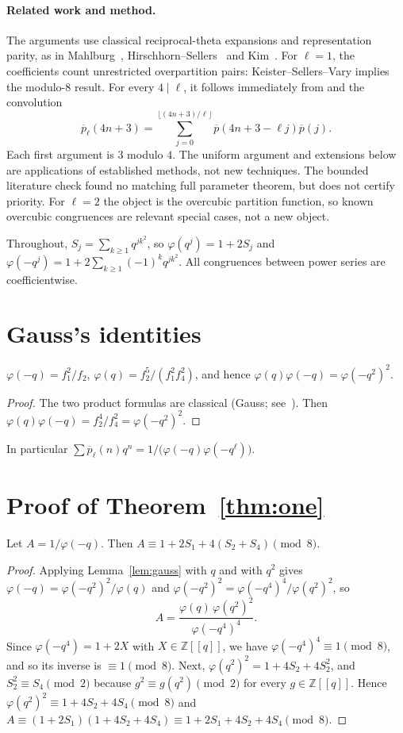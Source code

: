 \documentclass[11pt]{article}
\theoremstyle{remark}\newtheorem{remark}[theorem]{Remark}
\newcommand{\pb}{\overline{p}}
\begin{document}
\paragraph{Related work and method.} The arguments use classical reciprocal-theta expansions and representation parity, as in Mahlburg~\cite{Mahlburg}, Hirschhorn--Sellers~\cite{HS} and Kim~\cite{Kim08}. For $\ell=1$, the coefficients count unrestricted overpartition pairs: Keister--Sellers--Vary \cite[Theorem~9, $k=2$]{KSV} implies the modulo-$8$ result. For every $4\mid\ell$, it follows immediately from \cite[Theorem~2, equation~(6)]{HS} and the convolution
\[\pb_\ell(4n+3)=\sum_{j=0}^{\lfloor(4n+3)/\ell\rfloor}\pb(4n+3-\ell j)\pb(j).\]
Each first argument is $3$ modulo $4$. The uniform argument and extensions below are applications of established methods, not new techniques. The bounded literature check found no matching full parameter theorem, but does not certify priority. For $\ell=2$ the object is the overcubic partition function, so known overcubic congruences are relevant special cases, not a new object.

Throughout, $S_j=\sum_{k\ge1}q^{jk^2}$, so $\varphi(q^j)=1+2S_j$ and $\varphi(-q^j)=1+2\sum_{k\ge1}(-1)^kq^{jk^2}$. All congruences between power series are coefficientwise.

\section{Gauss's identities}
\begin{lemma}\label{lem:gauss}
$\varphi(-q)=f_1^2/f_2$, $\varphi(q)=f_2^5/(f_1^2f_4^2)$, and hence $\varphi(q)\varphi(-q)=\varphi(-q^2)^2$.
\end{lemma}
\begin{proof}
The two product formulas are classical (Gauss; see~\cite[Entry~22]{Berndt}). Then $\varphi(q)\varphi(-q)=f_2^4/f_4^2=\varphi(-q^2)^2$.
\end{proof}
In particular $\sum\pb_\ell(n)q^n=1/\bigl(\varphi(-q)\varphi(-q^\ell)\bigr)$.

\section{Proof of Theorem~\ref{thm:one}}
\begin{lemma}\label{lem:A}
Let $A=1/\varphi(-q)$. Then $A\equiv1+2S_1+4(S_2+S_4)\pmod 8$.
\end{lemma}
\begin{proof}
Applying Lemma~\ref{lem:gauss} with $q$ and with $q^2$ gives $\varphi(-q)=\varphi(-q^2)^2/\varphi(q)$ and $\varphi(-q^2)^2=\varphi(-q^4)^4/\varphi(q^2)^2$, so
\[A=\frac{\varphi(q)\,\varphi(q^2)^2}{\varphi(-q^4)^4}.\]
Since $\varphi(-q^4)=1+2X$ with $X\in\mathbb Z[[q]]$, we have $\varphi(-q^4)^4\equiv1\pmod8$, and so its inverse is $\equiv1\pmod 8$. Next, $\varphi(q^2)^2=1+4S_2+4S_2^2$, and $S_2^2\equiv S_4\pmod2$ because $g^2\equiv g(q^2)\pmod2$ for every $g\in\mathbb Z[[q]]$. Hence $\varphi(q^2)^2\equiv1+4S_2+4S_4\pmod 8$ and $A\equiv(1+2S_1)(1+4S_2+4S_4)\equiv1+2S_1+4S_2+4S_4\pmod8$.
\end{proof}
\end{document}
